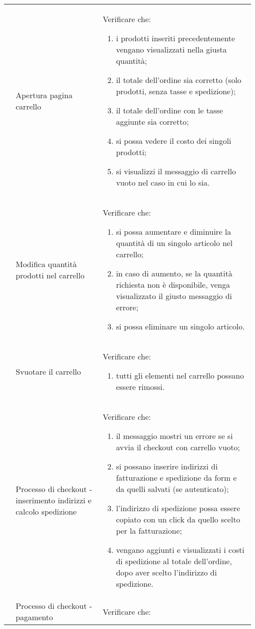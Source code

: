 \begin{center}
\begin{longtable}{p{1cm}|p{6.85cm}|p{7cm}|}
	 & Apertura pagina carrello & Verificare che: 
	\begin{enumerate}
		\item i prodotti inseriti precedentemente vengano visualizzati nella giusta quantità;
		\item il totale dell'ordine sia corretto (solo prodotti, senza tasse e spedizione);
		\item il totale dell'ordine con le tasse aggiunte sia corretto;
		\item si possa vedere il costo dei singoli prodotti;
		\item si visualizzi il messaggio di carrello vuoto nel caso in cui lo sia.
	\end{enumerate} \\
	 & Modifica quantità prodotti nel carrello & Verificare che:
	\begin{enumerate}
		\item si possa aumentare e diminuire la quantità di un singolo articolo nel carrello;
		\item in caso di aumento, se la quantità richiesta non è disponibile, venga visualizzato il giusto messaggio di errore;
		\item si possa eliminare un singolo articolo.
	\end{enumerate}\\
	 & Svuotare il carrello & Verificare che:
	\begin{enumerate}
		\item tutti gli elementi nel carrello possano essere rimossi.
	\end{enumerate} \\
	 & Processo di checkout - inserimento indirizzi e calcolo spedizione & Verificare che:
	\begin{enumerate}
		\item il messaggio mostri un errore se si avvia il checkout con carrello vuoto;
		\item si possano inserire indirizzi di fatturazione e spedizione da form e da quelli salvati (se autenticato);
		\item l'indirizzo di spedizione possa essere copiato con un click da quello scelto per la fatturazione;
		\item vengano aggiunti e visualizzati i costi di spedizione al totale dell'ordine, dopo aver scelto l'indirizzo di spedizione. 
	\end{enumerate} \\
	 & Processo di checkout - pagamento & Verificare che:

\end{longtable}
\end{center}
